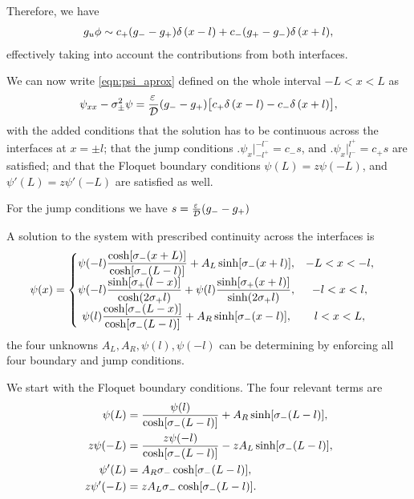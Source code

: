 Therefore, we have
% 
\begin{equation*}
\begin{split}
	g_u\phi\sim c_+(g_- - g_+)\delta\,(x-l) + c_-(g_+ - g_-)\delta\,(x+l),
\end{split}
\end{equation*}
% 
effectively taking into account the contributions from both interfaces.

We can now write \eqref{eqn:psi_aprox} defined on the whole interval $-L<x<L$ as
% 
\begin{equation*}
\begin{split}
	\psi_{xx} - \sigma_{\pm}^2\psi = \frac{\varepsilon\,}{\mathcal{D}}(g_- - g_+)\big[c_+\delta\,(x-l) - c_-\delta\,(x+l)\big],
\end{split}
\end{equation*}
% 
with the added conditions that the solution has to be continuous across the interfaces at $x=\pm l$; that the jump conditions $\Big.\psi_x\Big|_{-l^+}^{-l^-} = c_-s$, and $\Big.\psi_x\Big|_{l^-}^{l^+} = c_+s$ are satisfied; and that the Floquet boundary conditions $\psi(L) = z\psi(-L)$, and $\psi'(L) = z\psi'(-L)$ are satisfied as well. 

For the jump conditions we have $s = \frac{\varepsilon\,}{\mathcal{D}}(g_--g_+)$

A solution to the system with prescribed continuity across the interfaces is
% 
\begin{equation}
\label{eqn:psi_full}
	\begin{split}
	\psi(x) &= \left\{
	\begin{matrix}
	  \psi(-l)\dfrac{\cosh[\sigma_-(x+L)]}{\cosh[\sigma_-(L-l)]} + A_L\sinh[\sigma_-(x+l)],&-L<x<-l,\\
	  \psi(-l)\dfrac{\sinh[\sigma_+(l-x)]}{\cosh(2\sigma_+l)} + \psi(l)\dfrac{\sinh[\sigma_+(x+l)]}{\sinh(2\sigma_+l)},&-l<x<l,\\
	  \psi(l)\dfrac{\cosh[\sigma_-(L-x)]}{\cosh[\sigma_-(L-l)]} + A_R\sinh[\sigma_-(x-l)],&l<x<L,\\
	\end{matrix}\right.
	\end{split}
\end{equation}
% 
the four unknowns $A_L, A_R, \psi(l), \psi(-l)$ can be determining by enforcing all four boundary and jump conditions.

We start with the Floquet boundary conditions. The four relevant terms are
% 
\begin{equation*}
\begin{split}
\begin{aligned}
	\psi(L) &= \frac{\psi(l)}{\cosh[\sigma_-(L-l)]} + A_R\sinh[\sigma_-(L-l)],\\
	z\psi(-L) &= \frac{z\psi(-l)}{\cosh[\sigma_-(L-l)]} - zA_L\sinh[\sigma_-(L-l)],\\
	\psi'(L) &= A_R\sigma_-\cosh[\sigma_-(L-l)],\\
	z\psi'(-L) &= zA_L\sigma_-\cosh[\sigma_-(L-l)].\\
\end{aligned}
\end{split}
\end{equation*}
% 

